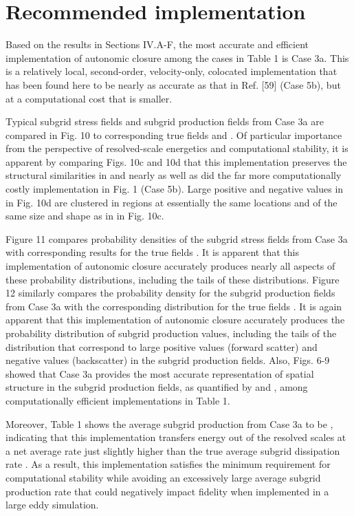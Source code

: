 \section{Recommended implementation}

Based on the results in Sections IV.A-F, the most accurate and efficient implementation of autonomic closure among the cases in Table 1 is Case 3a. This is a relatively local, second-order, velocity-only, colocated implementation that has been found here to be nearly as accurate as that in Ref. [59] (Case 5b), but at a computational cost that is   smaller.  

Typical subgrid stress fields   and subgrid production fields   from Case 3a are compared in Fig. 10 to corresponding true fields   and  . Of particular importance from the perspective of resolved-scale energetics and computational stability, it is apparent by comparing Figs. 10c and 10d that this implementation preserves the structural similarities in   and   nearly as well as did the far more computationally costly implementation in Fig. 1 (Case 5b). Large positive and negative values in   in Fig. 10d are clustered in regions at essentially the same locations and of the same size and shape as in   in Fig. 10c.   

Figure 11 compares probability densities of the subgrid stress fields   from Case 3a with corresponding results for the true fields  . It is apparent that this implementation of autonomic closure accurately produces nearly all aspects of these probability distributions, including the tails of these distributions. Figure 12 similarly compares the probability density for the subgrid production fields   from Case 3a with the corresponding distribution for the true fields  . It is again apparent that this implementation of autonomic closure accurately produces the probability distribution of subgrid production values, including the tails of the distribution that correspond to large positive values (forward scatter) and negative values (backscatter) in the subgrid production fields. Also, Figs. 6-9 showed that Case 3a provides the most accurate representation of spatial structure in the subgrid production fields, as quantified by   and  , among computationally efficient implementations in Table 1. 

Moreover, Table 1 shows the average subgrid production from Case 3a to be  , indicating that this implementation transfers energy out of the resolved scales at a net average rate just slightly higher than the true average subgrid dissipation rate  . As a result, this implementation satisfies the minimum requirement for computational stability while avoiding an excessively large average subgrid production rate that could negatively impact fidelity when implemented in a large eddy simulation.

